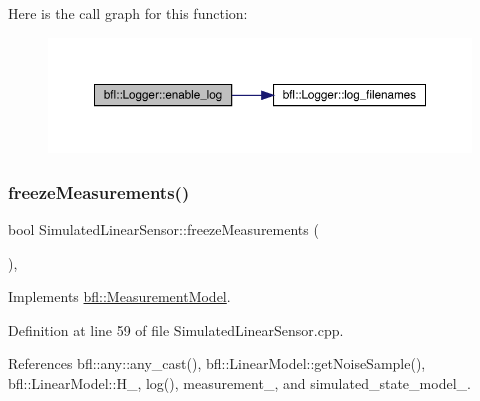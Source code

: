 Here is the call graph for this function\+:
\nopagebreak
\begin{figure}[H]
\begin{center}
\leavevmode
\includegraphics[width=350pt]{classbfl_1_1Logger_ae94b97b6e8d7902e8ce048384813122e_cgraph}
\end{center}
\end{figure}
\mbox{\label{classbfl_1_1SimulatedLinearSensor_a683f147d792a79c5ad4c6746210dfdee}} 
\subsubsection{\texorpdfstring{freeze\+Measurements()}{freezeMeasurements()}}
{\footnotesize\ttfamily bool Simulated\+Linear\+Sensor\+::freeze\+Measurements (\begin{DoxyParamCaption}{ }\end{DoxyParamCaption})\hspace{0.3cm}{\ttfamily [override]}, {\ttfamily [virtual]}}



Implements \mbox{\hyperlink{classbfl_1_1MeasurementModel_a67ef096c5b3682252582aec75498089d}{bfl\+::\+Measurement\+Model}}.



Definition at line 59 of file Simulated\+Linear\+Sensor.\+cpp.



References bfl\+::any\+::any\+\_\+cast(), bfl\+::\+Linear\+Model\+::get\+Noise\+Sample(), bfl\+::\+Linear\+Model\+::\+H\+\_\+, log(), measurement\+\_\+, and simulated\+\_\+state\+\_\+model\+\_\+.

